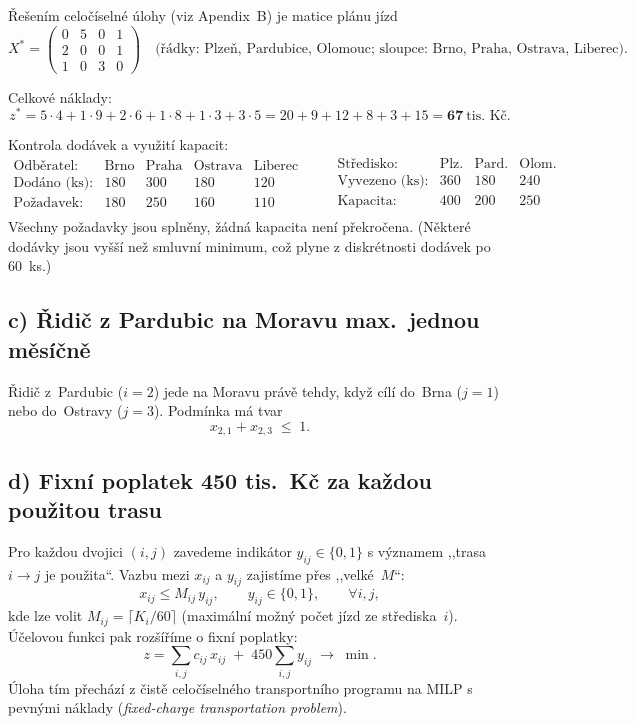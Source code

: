 \documentclass[11pt,a4paper]{article}
\begin{document}
	Řešením celočíselné úlohy (viz Apendix~B) je matice plánu jízd
	\[
	X^*=
	\begin{pmatrix}
		0 & 5 & 0 & 1 \\
		2 & 0 & 0 & 1 \\
		1 & 0 & 3 & 0
	\end{pmatrix}
	\quad\text{(řádky: Plzeň, Pardubice, Olomouc; sloupce: Brno, Praha, Ostrava, Liberec).}
	\]
	
	Celkové náklady:
	\[
	z^* = 5\cdot 4 + 1\cdot 9 + 2\cdot 6 + 1\cdot 8 + 1\cdot 3 + 3\cdot 5 = 20+9+12+8+3+15 = \mathbf{67}~\text{tis.\ Kč.}
	\]
	
	Kontrola dodávek a využití kapacit:
	\[
	\begin{array}{lcccc}
		\text{Odběratel:} & \text{Brno} & \text{Praha} & \text{Ostrava} & \text{Liberec}\\
		\text{Dodáno (ks):} & 180 & 300 & 180 & 120 \\
		\text{Požadavek:}  & 180 & 250 & 160 & 110 \\
	\end{array}
	\qquad
	\begin{array}{lccc}
		\text{Středisko:} & \text{Plz.} & \text{Pard.} & \text{Olom.} \\
		\text{Vyvezeno (ks):} & 360 & 180 & 240 \\
		\text{Kapacita:}    & 400 & 200 & 250 \\
	\end{array}
	\]
	Všechny požadavky jsou splněny, žádná kapacita není překročena. (Některé dodávky jsou vyšší než smluvní minimum, což plyne z diskrétnosti dodávek po 60~ks.)
	
	\subsection*{c) Řidič z Pardubic na Moravu max.\ jednou měsíčně}
	
	Řidič z~Pardubic ($i=2$) jede na Moravu právě tehdy, když cílí do~Brna ($j=1$) nebo do~Ostravy ($j=3$). Podmínka má tvar
	\[
	x_{2,1} + x_{2,3} \;\leq\; 1.
	\]
	
	\subsection*{d) Fixní poplatek 450 tis.\ Kč za každou použitou trasu}
	
	Pro každou dvojici $(i,j)$ zavedeme indikátor $y_{ij}\in\{0,1\}$ s významem ,,trasa $i\to j$ je použita``. Vazbu mezi $x_{ij}$ a $y_{ij}$ zajistíme přes ,,velké~$M$``:
	\[
	x_{ij} \leq M_{ij}\, y_{ij},\qquad y_{ij}\in\{0,1\},\qquad \forall i,j,
	\]
	kde lze volit $M_{ij}=\lceil K_i/60 \rceil$ (maximální možný počet jízd ze střediska~$i$). Účelovou funkci pak rozšíříme o fixní poplatky:
	\[
	z = \sum_{i,j} c_{ij}\,x_{ij} \;+\; 450\sum_{i,j} y_{ij} \;\to\;\min.
	\]
	Úloha tím přechází z čistě celočíselného transportního programu na MILP s pevnými náklady (\emph{fixed-charge transportation problem}).
	
\end{document}
